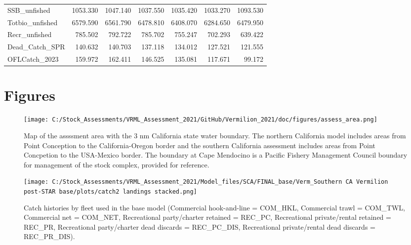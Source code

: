 \documentclass[11pt,
  english,
]{article}
\begin{document}
\begin{landscape}
\begin{table}
\begin{tabular}[t]{lrrrrrr}
SSB\_unfished & 1053.330 & 1047.140 & 1037.550 & 1035.420 & 1033.270 & 1093.530\\
Totbio\_unfished & 6579.590 & 6561.790 & 6478.810 & 6408.070 & 6284.650 & 6479.950\\
Recr\_unfished & 785.502 & 792.722 & 785.702 & 755.247 & 702.293 & 639.422\\
Dead\_Catch\_SPR & 140.632 & 140.703 & 137.118 & 134.012 & 127.521 & 121.555\\
OFLCatch\_2023 & 159.972 & 162.411 & 146.525 & 135.081 & 117.671 & 99.172\\
\bottomrule
\end{tabular}
\end{table}
\end{landscape}


\hypertarget{figures}{%
\section*{Figures}\label{figures}}

\leavevmode\tagmcend\tagstructend

\begin{figure}
\centering
\texttt{[image: C:/Stock\_Assessments/VRML\_Assessment\_2021/GitHub/Vermilion\_2021/doc/figures/assess\_area.png]}
\caption{Map of the assssment area with the 3 nm California state water boundary. The northern California model includes areas from Point Conception to the California-Oregon border and the southern California assessment includes areas from Point Concpetion to the USA-Mexico border. The boundary at Cape Mendocino is a Pacific Fishery Management Council boundary for management of the stock complex, provided for reference.\label{fig:assess-area}}
\end{figure}

\begin{figure}
\centering
\texttt{[image: C:/Stock\_Assessments/VRML\_Assessment\_2021/Model\_files/SCA/FINAL\_base/Verm\_Southern CA Vermilion post-STAR base/plots/catch2 landings stacked.png]}
\caption{Catch histories by fleet used in the base model (Commercial hook-and-line = COM\_HKL, Commercial trawl = COM\_TWL, Commercial net = COM\_NET, Recreational party/charter retained = REC\_PC, Recreational private/rental retained = REC\_PR, Recreational party/charter dead discards = REC\_PC\_DIS, Recreational private/rental dead discards = REC\_PR\_DIS).\label{fig:catch}}
\end{figure}
\end{document}
